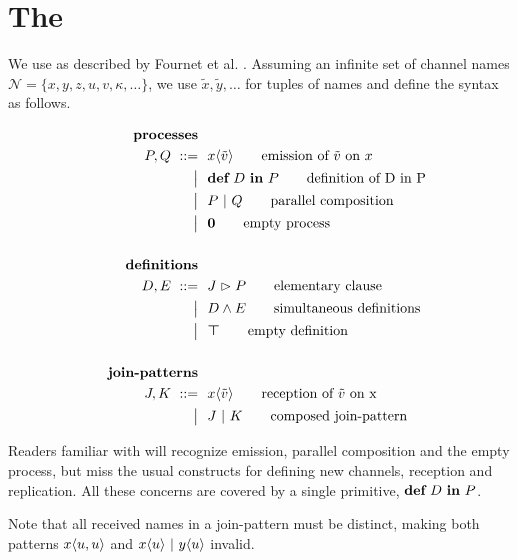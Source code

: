 \section{The \JoinCalc}


We use \joincalc as described by Fournet et al.
\cite{fournet_calculus_1996}.
Assuming an infinite set of channel names
$ \mathcal{N} = \{ x, y, z, u, v, \kappa, \ldots \} $,
we use
$ \tilde{x}, \tilde{y}, \ldots $
for tuples of names
and define the syntax as follows.

\begin{align}
  \tag*{\textbf{processes}}
  \\
  P, Q
  \grmr \jsnd{x}{\tilde{v}}   \tag*{emission of $\tilde{v}$ on $x$}
  \altn \nonumber \jdef{D}{P} \tag*{definition of D in P}
  \altn P \jpar Q             \tag*{parallel composition}
  \altn \jnullproc            \tag*{empty process}
  \\ \nonumber
  \\
  \tag*{\textbf{definitions}}
  \\
  D, E
  \grmr \jrct{J}{P} \tag*{elementary clause}
  \altn D \jcon E   \tag*{simultaneous definitions}
  \altn \jnulldef   \tag*{empty definition}
  \\ \nonumber
  \\
  \tag*{\textbf{join-patterns}}
  \\
  J, K
  \grmr \jrcv{x}{\tilde{v}} \tag*{reception of $\tilde{v}$ on x}
  \altn J \jpat K           \tag*{composed join-pattern}
\end{align}

Readers familiar with \asyncpicalc
\cite{honda_object_1991}
\cite{boudol_asynchrony_1992}
will recognize emission,
parallel composition and the empty process, but miss the usual constructs for
defining new channels, reception and replication.
All these concerns are covered by a single primitive,
$ \textbf{def} \ D \ \textbf{in} \ P $.


Note that all received names in a join-pattern must be distinct,
making both patterns
$ x\langle u,u\rangle $ and
$ x\langle u\rangle \ |\  y\langle u\rangle $
invalid.


